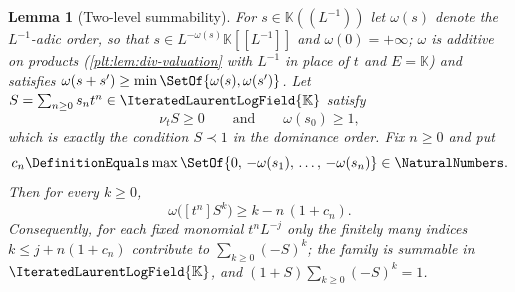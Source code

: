 \documentclass[11pt,oneside]{article}
\theoremstyle{plain}
\newtheorem{lemma}[theorem]{Lemma}
\theoremstyle{definition}
\theoremstyle{remark}
\newcommand{\K}{\mathbb{K}}
\newcommand{\PLit}{\IteratedLaurentLogField{\K}}         %
\newcommand{\ordt}{\nu_{t}}                              %
\newcommand{\precdom}{\prec}
\begin{document}
\begin{lemma}[Two-level summability]\label{plt:lem:div-two-level}
For \(s\in\K((L^{-1}))\) let \(\omega(s)\) denote the \(L^{-1}\)-adic order, so
that \(s\in L^{-\omega(s)}\K[[L^{-1}]]\) and \(\omega(0)=+\infty\); \(\omega\)
is additive on products (\cref{plt:lem:div-valuation} with \(L^{-1}\) in place
of \(t\) and \(E=\K\)) and satisfies
\(\omega(s+s')\ge\min\SetOf{\omega(s),\omega(s')}\).  Let
\(S=\sum_{n\ge0}s_{n}t^{n}\in\PLit\) satisfy
\begin{equation}\label{plt:eq:div-small-S}
  \ordt S\ge0
  \qquad\text{and}\qquad
  \omega(s_{0})\ge1 ,
\end{equation}
which is exactly the condition \(S\precdom1\) in the dominance order.  Fix
\(n\ge0\) and put
\[
  c_{n}\DefinitionEquals
  \max\SetOf{0,\,-\omega(s_{1}),\,\dots,\,-\omega(s_{n})}
  \in\NaturalNumbers .
\]
Then for every \(k\ge0\),
\begin{equation}\label{plt:eq:div-two-level-order}
  \omega\bigl([t^{n}]S^{k}\bigr)\ge k-n\,(1+c_{n}).
\end{equation}
Consequently, for each fixed monomial \(t^{n}L^{-j}\) only the finitely many
indices \(k\le j+n(1+c_{n})\) contribute to \(\sum_{k\ge0}(-S)^{k}\); the
family is summable in \(\PLit\), and \((1+S)\sum_{k\ge0}(-S)^{k}=1\).
\end{lemma}
\end{document}

